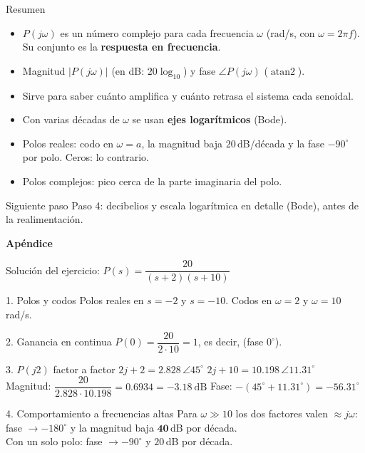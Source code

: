 \documentclass[aspectratio=169,11pt]{beamer}
\newcommand{\ang}[1]{\angle #1^\circ}
\begin{document}
\begin{frame}{Resumen}
  \begin{itemize}
    \item $P(j\omega)$ es un número complejo para cada frecuencia $\omega$ (rad/s, con $\omega=2\pi f$). Su conjunto es la \textbf{respuesta en frecuencia}.
    \item Magnitud $|P(j\omega)|$ (en dB: $20\log_{10}$) y fase $\angle P(j\omega)$ ($\operatorname{atan2}$).
    \item Sirve para saber cuánto amplifica y cuánto retrasa el sistema cada senoidal.
    \item Con varias décadas de $\omega$ se usan \textbf{ejes logarítmicos} (Bode).
    \item Polos reales: codo en $\omega=a$, la magnitud baja $20$\,dB/década y la fase $-90^\circ$ por polo. Ceros: lo contrario.
    \item Polos complejos: pico cerca de la parte imaginaria del polo.
  \end{itemize}
  \vspace{6pt}
  \begin{block}{Siguiente paso}
    Paso 4: decibelios y escala logarítmica en detalle (Bode), antes de la realimentación.
  \end{block}
\end{frame}

\appendix
\begin{frame}
  \centering
  \vspace{1.2cm}
  {\Huge\bfseries Apéndice}
\end{frame}

\begin{frame}{Solución del ejercicio: $P(s)=\dfrac{20}{(s+2)(s+10)}$}
  \footnotesize
  \setlength{\parskip}{1pt}
  \begin{block}{1. Polos y codos}
    Polos reales en $s=-2$ y $s=-10$. Codos en $\omega=2$ y $\omega=10$\,rad/s.
  \end{block}
  \begin{block}{2. Ganancia en continua}
    $P(0)=\dfrac{20}{2\cdot10}=1$, es decir,  (fase $0^\circ$).
  \end{block}
  \begin{block}{3. $P(j2)$ factor a factor}
    $2j+2=2.828\,\ang{45}$ \quad $2j+10=10.198\,\ang{11.31}$\\
    Magnitud: $\dfrac{20}{2.828\cdot10.198}=0.6934=\boxed{-3.18\ \text{dB}}$ \qquad Fase: $-(45^\circ+11.31^\circ)=\boxed{-56.31^\circ}$\\
  \end{block}
  \begin{block}{4. Comportamiento a frecuencias altas}
    Para $\omega\gg10$ los dos factores valen $\approx j\omega$: fase $\to-180^\circ$ y la magnitud baja $\mathbf{40}$\,dB por década.\\
    Con un solo polo: fase $\to-90^\circ$ y $20$\,dB por década.
  \end{block}
\end{frame}
\end{document}
